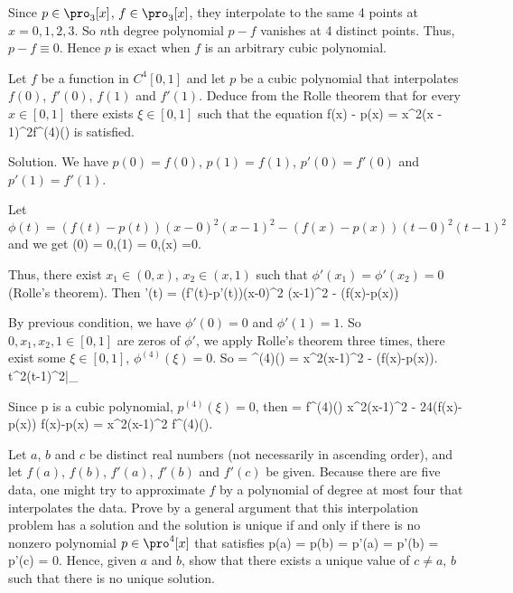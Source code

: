 Since $p\in \pro_3[x]$, $f\in \pro_3[x]$, they interpolate to the same 4 points at $x=0,1,2,3$. So $n$th degree polynomial $p-f$ vanishes at 4 distinct points. Thus, $p-f\equiv 0$. Hence $p$ is exact when $f$ is an arbitrary cubic polynomial.



\item Let $f$ be a function in $C^4[0, 1]$ and let $p$ be a cubic polynomial that interpolates $f(0)$, $f'(0)$, $f(1)$ and $f'(1)$. Deduce from the Rolle theorem that for every $x \in [0, 1]$ there exists $\xi \in [0, 1]$ such that the equation
\be
f(x) - p(x) = x^2(x - 1)^2f^{(4)}(\xi)
\ee
is satisfied.



Solution. We have $p(0)=f(0)$, $p(1) =f(1)$, $p'(0) = f'(0)$ and $p'(1) = f'(1)$.

Let $\phi(t) = (f(t)-p(t))(x-0)^2 (x-1)^2 - (f(x)-p(x))(t-0)^2(t-1)^2$ and we get
\be
\phi(0) = 0,\quad \phi(1) = 0,\quad \phi(x) =0.
\ee

Thus, there exist $x_1\in (0,x)$, $x_2 \in (x,1)$ such that $\phi'(x_1) = \phi'(x_2) = 0$ (Rolle's theorem). Then
\be
\phi'(t) = (f'(t)-p'(t))(x-0)^2 (x-1)^2 - (f(x)-p(x))
\ee

By previous condition, we have $\phi'(0) = 0$ and $\phi'(1) =1$. So $0,x_1,x_2,1\in [0,1]$ are zeros of $\phi'$, we apply Rolle's theorem three times, there exist some $\xi \in [0,1]$, $\phi^{(4)}(\xi) = 0$. So
 = \phi^{(4)}(\xi) =  x^2(x-1)^2 - (f(x)-p(x))\left. t^2(t-1)^2\right|_\xi
\ee

Since p is a cubic polynomial, $p^{(4)}(\xi) = 0$, then
 = f^{(4)}(\xi) x^2(x-1)^2 - 24(f(x)-p(x)) \quad\ra\quad f(x)-p(x) =  x^2(x-1)^2 f^{(4)}(\xi).
\ee



\item Let $a$, $b$ and $c$ be distinct real numbers (not necessarily in ascending order), and let $f(a)$, $f(b)$, $f'(a)$, $f'(b)$ and $f'(c)$ be given. Because there are five data, one might try to approximate $f$ by a polynomial of degree at most four that interpolates the data. Prove by a general argument that this interpolation problem has a solution and the solution is unique if and only if there is no nonzero polynomial $p \in \pro^4[x]$ that satisfies 
\be
p(a) = p(b) = p'(a) = p'(b) = p'(c) = 0.
\ee
Hence, given $a$ and $b$, show that there exists a unique value of $c \neq a$, $b$ such that there is no unique solution.

